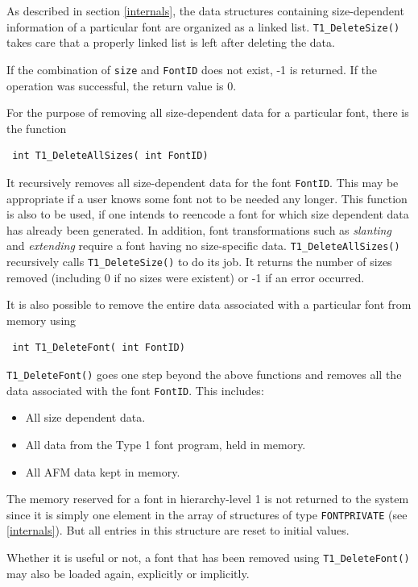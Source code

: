 As described in section \ref{internals}, the data structures containing
size-dependent information of a particular font are organized as a
linked list. \verb+T1_DeleteSize()+ takes care that a properly linked
list is left after deleting the data.

If the combination of \verb+size+ and \verb+FontID+ does not exist, -1
is returned. If the operation was successful, the return value is 0.

For the purpose of removing all size-dependent data for a particular
font, there is the function
\precorr
\begin{verbatim}
 int T1_DeleteAllSizes( int FontID)
\end{verbatim}\postcorr
It recursively removes all size-dependent data for the font
\verb+FontID+. This may be appropriate if a user knows some font not
to be needed any longer. This function is also to be used, if one intends to
reencode a font for 
which size dependent data has already been generated. In addition,
 font transformations
such as {\em slanting} and {\em extending} 
require a font having no size-specific data. 
\verb+T1_DeleteAllSizes()+ recursively calls \verb+T1_DeleteSize()+ to
do its job.
It returns the number of sizes removed (including 0 if no sizes were
existent) or -1 if an error occurred.

It is also possible to remove the entire data  associated with a
particular font from memory using
\precorr
\begin{verbatim}
 int T1_DeleteFont( int FontID)
\end{verbatim}\postcorr
\verb+T1_DeleteFont()+ goes one step beyond the above functions and
removes all the data associated with the font \verb+FontID+. This
includes:
\begin{itemize}
\item All size dependent data.
\item All data from the Type 1 font program, held in memory.
\item All AFM data kept in memory. 
\end{itemize}
The memory reserved for a font in hierarchy-level 1 is not returned to
the system since it is simply one element in the array of structures of
type \verb+FONTPRIVATE+ (see \ref{internals}). But all entries in this
structure are reset to initial values.

Whether it is useful or not, a font that has been removed using
\verb+T1_DeleteFont()+ may also be loaded again, explicitly or
implicitly.

